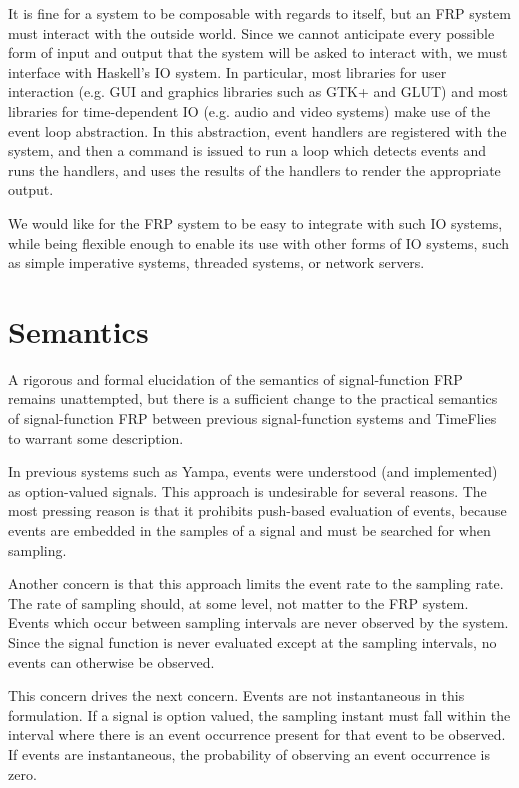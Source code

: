 It is fine for a system to be composable with regards to itself, but an FRP
system must interact with the outside world. Since we cannot anticipate every
possible form of input and output that the system will be asked to interact
with, we must interface with Haskell's IO system. In particular, most libraries
for user interaction (e.g. GUI and graphics libraries such as GTK+ and GLUT) and
most libraries for time-dependent IO (e.g. audio and video systems) make use of
the event loop abstraction. In this abstraction, event handlers are registered
with the system, and then a command is issued to run a loop which detects events
and runs the handlers, and uses the results of the handlers to render the
appropriate output. 

We would like for the FRP system to be easy to integrate with such IO systems,
while being flexible enough to enable its use with other forms of IO systems,
such as simple imperative systems, threaded systems, or network servers.

\section{Semantics}
\label{section:System_Design_and_Interface-Semantics}

A rigorous and formal elucidation of the semantics of signal-function FRP remains
unattempted, but there is a sufficient change to the practical semantics of
signal-function FRP between previous signal-function systems and TimeFlies to warrant
some description.

In previous systems such as Yampa, events were understood (and implemented) as option-valued
signals. This approach is undesirable for several reasons. The most pressing reason is
that it prohibits push-based evaluation of events, because events are embedded in the
samples of a signal and must be searched for when sampling.

Another concern is that this approach limits the event rate to the sampling rate.
The rate of sampling should, at some level, not matter to the FRP system. Events
which occur between sampling intervals are never observed by the system. Since
the signal function is never evaluated except at the sampling intervals, no
events can otherwise be observed.

This concern drives the next concern. Events are not instantaneous in this formulation.
If a signal is option valued, the sampling instant must fall within the interval where
there is an event occurrence present for that event to be observed. If events are
instantaneous, the probability of observing an event occurrence is zero.

